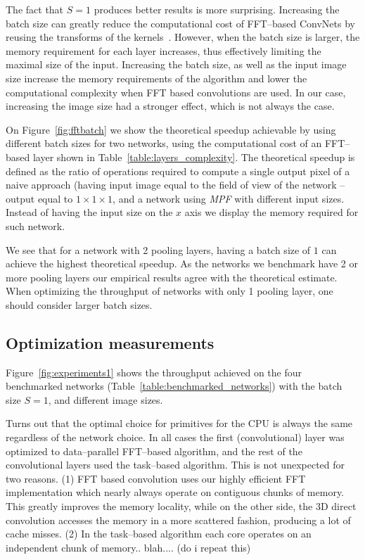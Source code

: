 \documentclass[conference]{./IEEEtran/IEEEtran}
\begin{document}
  The fact that $S=1$ produces better results is more surprising.
  Increasing the batch size can greatly reduce the computational cost
  of FFT--based ConvNets by reusing the transforms of the
  kernels~\cite{mathieu-iclr-14,vasilache2014fast}.  However, when the
  batch size is larger, the memory requirement for each layer
  increases, thus effectively limiting the maximal size of the input.
  Increasing the batch size, as well as the input image size increase
  the memory requirements of the algorithm and lower the computational
  complexity when FFT based convolutions are used.  In our case,
  increasing the image size had a stronger effect, which is not always
  the case.

  On Figure~\ref{fig:fftbatch} we show the theoretical speedup
  achievable by using different batch sizes for two networks, using
  the computational cost of an FFT--based layer shown in
  Table~\ref{table:layers_complexity}.  The theoretical speedup is
  defined as the ratio of operations required to compute a single
  output pixel of a naive approach (having input image equal to the
  field of view of the network -- output equal to $1 \times 1 \times
  1$, and a network using \emph{MPF} with different input sizes.
  Instead of having the input size on the $x$ axis we display the
  memory required for such network.

  We see that for a network with 2 pooling layers, having a batch size
  of $1$ can achieve the highest theoretical speedup.  As the networks
  we benchmark have 2 or more pooling layers our empirical results
  agree with the theoretical estimate.  When optimizing the throughput
  of networks with only 1 pooling layer, one should consider larger
  batch sizes.

\subsection{Optimization measurements}

  Figure~\ref{fig:experiments1} shows the throughput achieved on the
  four benchmarked networks (Table~\ref{table:benchmarked_networks})
  with the batch size $S=1$, and different image sizes.

  Turns out that the optimal choice for primitives for the CPU is
  always the same regardless of the network choice.  In all cases the
  first (convolutional) layer was optimized to data--parallel
  FFT--based algorithm, and the rest of the convolutional layers used
  the task--based algorithm.  This is not unexpected for two
  reasons. (1) FFT based convolution uses our highly efficient FFT
  implementation which nearly always operate on contiguous chunks of
  memory. This greatly improves the memory locality, while on the
  other side, the 3D direct convolution accesses the memory in a more
  scattered fashion, producing a lot of cache misses.  (2) In the      %
  task--based algorithm each core operates on an independent chunk of
  memory.. blah.... (do i repeat this)
\end{document}
